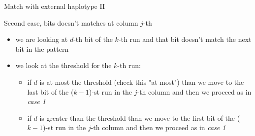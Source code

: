 \documentclass{beamer}
\begin{document}
                                                                    \begin{frame}{Match with external haplotype II}
                                                                    \begin{block}{Second case, bits doesn't matches at column $j$-th}
                                                                    \begin{itemize}
                                                                    \item we are looking at $d$-th bit of the $k$-th run and that bit
                                                                    doesn't match the next bit in the pattern 
                                                                    \item we look at the threshold for the $k$-th run:
                                                                    \begin{itemize}
                                                                    \item if $d$ is at most the threshold (check this "at most") than we
                                                                    move to the last bit of the ($k-1$)-st run in the $j$-th column and
                                                                    then we proceed as in \textit{case 1}  
                                                                    \item if $d$ is greater than the threshold than we move to the first
                                                                    bit of the ($k-1$)-st run in the $j$-th column and then we proceed
                                                                    as in \textit{case 1}  
                                                                    \end{itemize}
                                                                    \end{itemize}
                                                                    \end{block}
                                                                    \end{frame}
\end{document}
